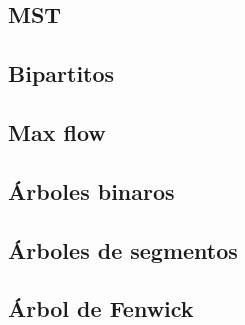 \subsection{MST}
\subsection{Bipartitos}
\subsection{Max flow}
\subsection{Árboles binaros}
\subsection{Árboles de segmentos}
\subsection{Árbol de Fenwick}
